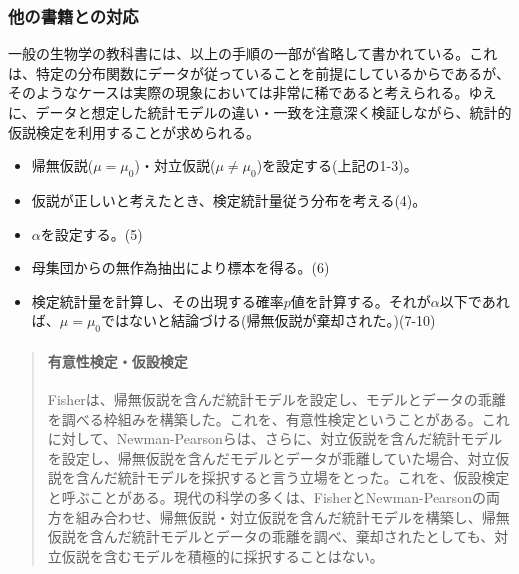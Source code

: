 \documentclass[a4paper,11pt,dvipdfmx]{jsarticle}
\begin{document}
\subsubsection{他の書籍との対応}
一般の生物学の教科書には、以上の手順の一部が省略して書かれている。これは、特定の分布関数にデータが従っていることを前提にしているからであるが、そのようなケースは実際の現象においては非常に稀であると考えられる。ゆえに、データと想定した統計モデルの違い・一致を注意深く検証しながら、統計的仮説検定を利用することが求められる。
\begin{framed}
    \begin{itemize}
        \item 帰無仮説($\mu = \mu_0$)・対立仮説($\mu\neq \mu_0$)を設定する(上記の1-3)。
        \item 仮説が正しいと考えたとき、検定統計量従う分布を考える(4)。
        \item $\alpha$を設定する。(5)
        \item 母集団からの無作為抽出により標本を得る。(6)
        \item 検定統計量を計算し、その出現する確率$p$値を計算する。それが$\alpha$以下であれば、$\mu=\mu_0$ではないと結論づける(帰無仮説が棄却された。)(7-10)
    \end{itemize}
\end{framed}



\begin{mybox}
    \begin{quotation}
    \paragraph{有意性検定・仮設検定\cite{鳥類学における統計学_2018}}
    Fisherは、帰無仮説を含んだ統計モデルを設定し、モデルとデータの乖離を調べる枠組みを構築した。これを、有意性検定ということがある。これに対して、Newman-Pearsonらは、さらに、対立仮説を含んだ統計モデルを設定し、帰無仮説を含んだモデルとデータが乖離していた場合、対立仮説を含んだ統計モデルを採択すると言う立場をとった。これを、仮設検定と呼ぶことがある。現代の科学の多くは、FisherとNewman-Pearsonの両方を組み合わせ、帰無仮説・対立仮説を含んだ統計モデルを構築し、帰無仮説を含んだ統計モデルとデータの乖離を調べ、棄却されたとしても、対立仮説を含むモデルを積極的に採択することはない。
    \end{quotation}
\end{mybox}
\end{document}
